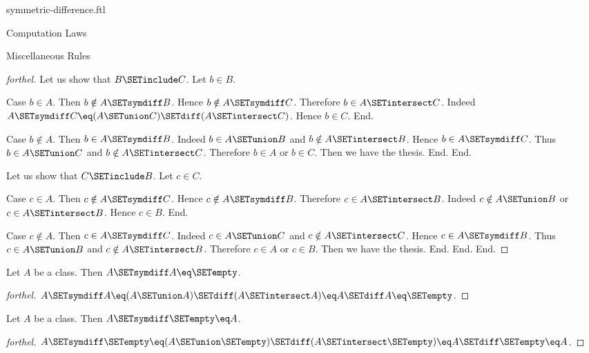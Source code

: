 \documentclass{naproche-library}
\begin{document}
\begin{smodule}[title=Symmetric Difference]{symmetric-difference.ftl}
\begin{sfragment}{Computation Laws}
\begin{sfragment}{Miscellaneous Rules}
\begin{proof}[forthel]
        Let us show that $B \SETinclude C$.
          Let $b \in B$.

          Case $b \in A$.
            Then $b \notin A \SETsymdiff B$.
            Hence $b \notin A \SETsymdiff C$.
            Therefore $b \in A \SETintersect C$.
            Indeed $A \SETsymdiff C \eq (A \SETunion C) \SETdiff (A \SETintersect C)$.
            Hence $b \in C$.
          End.

          Case $b \notin A$.
            Then $b \in A \SETsymdiff B$.
            Indeed $b \in A \SETunion B$ and $b \notin A \SETintersect B$.
            Hence $b \in A \SETsymdiff C$.
            Thus $b \in A \SETunion C$ and $b \notin A \SETintersect C$.
            Therefore $b \in A$ or $b \in C$.
            Then we have the thesis.
          End.
        End.

        Let us show that $C \SETinclude B$.
          Let $c \in C$.

          Case $c \in A$.
            Then $c \notin A \SETsymdiff C$.
            Hence $c \notin A \SETsymdiff B$.
            Therefore $c \in A \SETintersect B$.
            Indeed $c \notin A \SETunion B$ or $c \in A \SETintersect B$.
            Hence $c \in B$.
          End.

          Case $c \notin A$.
            Then $c \in A \SETsymdiff C$.
            Indeed $c \in A \SETunion C$ and $c \notin A \SETintersect C$.
            Hence $c \in A \SETsymdiff B$.
            Thus $c \in A \SETunion B$ and $c \notin A \SETintersect B$.
            Therefore $c \in A$ or $c \in B$.
            Then we have the thesis.
          End.
        End.
      End.
    \end{proof}

    \begin{proposition}[forthel,id=FOUNDATIONS_03_4578696040022016]
      Let $A$ be a class.
      Then $A \SETsymdiff A \eq \SETempty$.
    \end{proposition}
    \begin{proof}[forthel]
      $A \SETsymdiff A
        \eq (A \SETunion A) \SETdiff (A \SETintersect A)
        \eq A \SETdiff A
        \eq \SETempty$.
    \end{proof}

    \begin{proposition}[forthel,id=FOUNDATIONS_03_6698730398941184]
      Let $A$ be a class.
      Then $A \SETsymdiff \SETempty \eq A$.
    \end{proposition}
    \begin{proof}[forthel]
      $A \SETsymdiff \SETempty
        \eq (A \SETunion \SETempty) \SETdiff (A \SETintersect \SETempty)
        \eq A \SETdiff \SETempty
        \eq A$.
    \end{proof}


\end{sfragment}
\end{sfragment}
\end{smodule}
\end{document}
